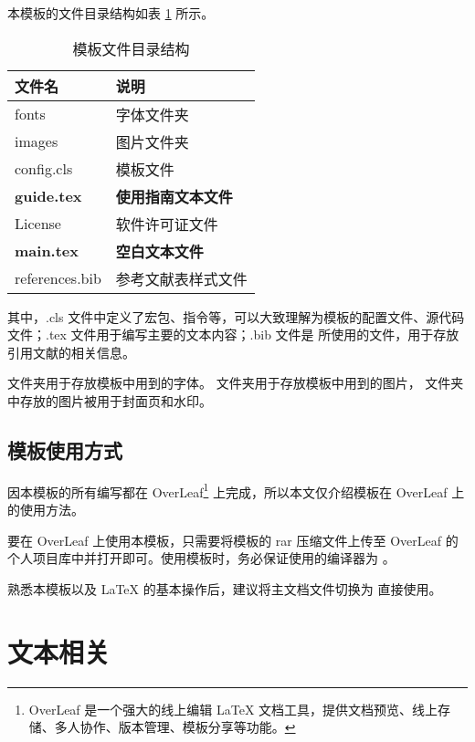 \documentclass[report,oneside,UTF8,zihao=-4]{config}
\begin{document}
本模板的文件目录结构如表 \ref{tab:文件目录} 所示。

\begin{table}
  \centering
  \caption{模板文件目录结构}
  \label{tab:文件目录}
  \setlength{\tabcolsep}{30pt} %
  \begin{tabular}{ll}
    \toprule[1.5pt]
    \textbf{文件名}           & \textbf{说明}\\
    \midrule[0.8pt]
    fonts                    & 字体文件夹\\
    images                   & 图片文件夹\\
    config.cls               & 模板文件\\
    \textbf{guide.tex}       & \textbf{使用指南文本文件}\\
    License                  & 软件许可证文件\\
    \textbf{main.tex}        & \textbf{空白文本文件}\\
    references.bib           & 参考文献表样式文件\\
    \bottomrule[1.5pt]
  \end{tabular}
\end{table}

其中，.cls 文件中定义了宏包、指令等，可以大致理解为模板的配置文件、源代码文件；.tex 文件用于编写主要的文本内容；.bib 文件是  所使用的文件，用于存放引用文献的相关信息。

 文件夹用于存放模板中用到的字体。 文件夹用于存放模板中用到的图片， 文件夹中存放的图片被用于封面页和水印。

\section{模板使用方式}

因本模板的所有编写都在 OverLeaf\footnote{OverLeaf 是一个强大的线上编辑 \LaTeX{} 文档工具，提供文档预览、线上存储、多人协作、版本管理、模板分享等功能。} 上完成，所以本文仅介绍模板在 OverLeaf 上的使用方法。

要在 OverLeaf 上使用本模板，只需要将模板的 rar 压缩文件上传至 OverLeaf 的个人项目库中并打开即可。使用模板时，务必保证使用的编译器为 。

熟悉本模板以及 \LaTeX{} 的基本操作后，建议将主文档文件切换为  直接使用。

\chapter{文本相关}
\end{document}
